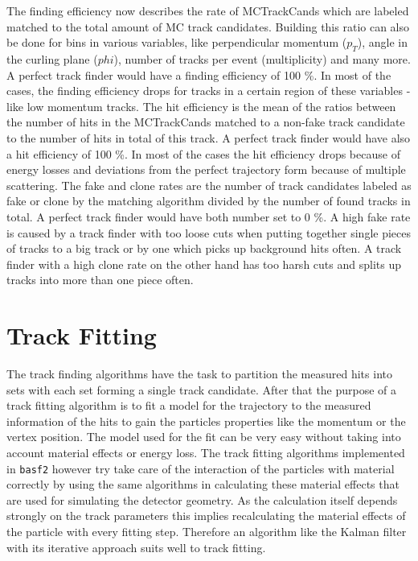 The finding efficiency now describes the rate of MCTrackCands which are labeled matched to the total amount of MC track candidates. Building this ratio can also be done for bins in various variables, like perpendicular momentum ($p_T$), angle in the curling plane ($phi$), number of tracks per event (multiplicity) and many more. A perfect track finder would have a finding efficiency of 100 \%. In most of the cases, the finding efficiency drops for tracks in a certain region of these variables - like low momentum tracks.
The hit efficiency is the mean of the ratios between the number of hits in the MCTrackCands matched to a non-fake track candidate to the number of hits in total of this track. A perfect track finder would have also a hit efficiency of 100 \%. In most of the cases the hit efficiency drops because of energy losses and deviations from the perfect trajectory form because of multiple scattering.
The fake and clone rates are the number of track candidates labeled as fake or clone by the matching algorithm divided by the number of found tracks in total. A perfect track finder would have both number set to 0 \%. A high fake rate is caused by a track finder with too loose cuts when putting together single pieces of tracks to a big track or by one which picks up background hits often. A track finder with a high clone rate on the other hand has too harsh cuts and splits up tracks into more than one piece often.

\section{Track Fitting}

The track finding algorithms have the task to partition the measured hits into sets with each set forming a single track candidate. After that the purpose of a track fitting algorithm is to fit a model for the trajectory to the measured information of the hits to gain the particles properties like the momentum or the vertex position. The model used for the fit can be very easy without taking into account material effects or energy loss. The track fitting algorithms implemented in \texttt{basf2} however try take care of the interaction of the particles with material correctly by using the same algorithms in calculating these material effects that are used for simulating the detector geometry. As the calculation itself depends strongly on the track parameters this implies recalculating the material effects of the particle with every fitting step. Therefore an algorithm like the Kalman filter with its iterative approach suits well to track fitting.

